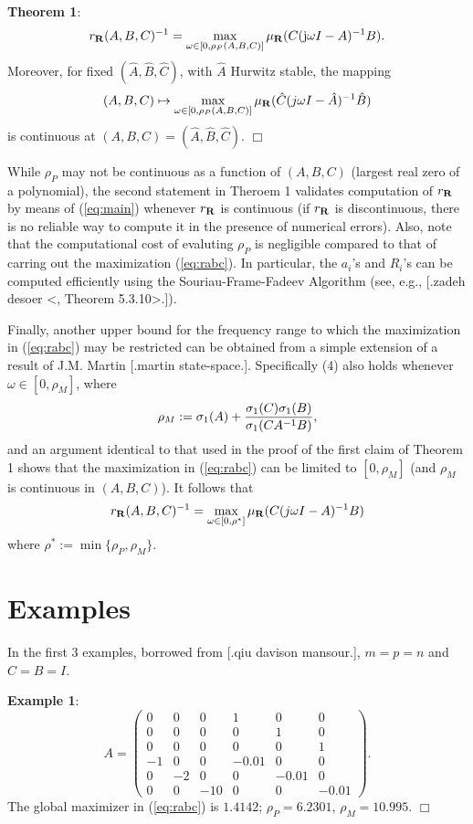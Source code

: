 \bigskip\noindent
{\bf Theorem 1}: 
\begin{equation}
r_{\bf R}(A,B,C)^{-1}=\max_{\omega \in [0, \rho_P(A,B,C)]}
\mu_{\bf R}(C({\rm j}\omega I-A)^{-1}B).
\label{eq:main}
\end{equation}
Moreover, for fixed $(\hat{A}, \hat{B}, \hat{C})$, with $\hat A$
Hurwitz stable, the mapping
\[
(A,B,C) \mapsto \max_{\omega \in [0,\rho_P(A,B,C)]}
\mu_{\bf R}(\hat{C}(j \omega I-\hat{A})^{-1}\hat{B})
\]
is continuous at $(A,B,C)=(\hat{A}, \hat{B}, \hat{C})$.
\hfill $\Box$

\noindent
While $\rho_P$ may not be continuous as a function of $(A,B,C)$ (largest 
real zero of a polynomial), the second statement in Theroem 1 
validates computation of $r_{\bf R}$ by means of (\ref{eq:main}) 
whenever $r_{\bf R}$ is continuous (if $r_{\bf R}$ is discontinuous, there 
is no reliable way to compute it in the presence of numerical errors).
Also, note that the computational cost of evaluting $\rho_P$ is 
negligible compared to that of carring out the maximization (\ref{eq:rabc}).
In particular, the $a_i$'s and $R_i$'s can be computed efficiently using
the Souriau-Frame-Fadeev Algorithm (see, e.g.,  [.zadeh desoer 
<, Theorem 5.3.10>.]).

Finally, another upper bound for the frequency range to which the maximization
in (\ref{eq:rabc}) may be restricted can be obtained from a simple extension
of a result of J.M. Martin [.martin state-space.]. Specifically (4) also holds 
whenever
$\omega \in [0,\rho_M]$, where 
\[
\rho_M:=\sigma_1(A)+{\sigma_1(C) \sigma_1(B) \over \sigma_1(CA^{-1}B)},
\]
and an argument identical to that used in the proof of the first claim of
Theorem 1 shows that the maximization in (\ref{eq:rabc}) can be limited to 
$[0, \rho_M]$ (and $\rho_M$ is continuous in $(A,B,C)$). It follows that
\[
r_{\bf R}(A,B,C)^{-1}=\max_{\omega \in [0,\rho^*]} \mu_{\bf R}(C(j\omega I-A)^{-1}B)
\]
where $\rho^*:=\min \{\rho_P, \rho_M\}$.

\bigskip
\section{Examples}

In the first $3$ examples, borrowed from [.qiu davison mansour.],
$m=p=n$ and $C=B=I$.

\smallskip
\noindent
{\bf Example 1}:
\[ A=
\left( \begin{array}{cccccc}
0 & 0 & 0 & 1 & 0 & 0 \\
0 & 0 & 0 & 0 & 1 & 0 \\
0 & 0 & 0 & 0 & 0 & 1 \\
-1 & 0 & 0 & -0.01 & 0 & 0 \\
0 & -2 & 0 & 0 & -0.01 & 0 \\
0 & 0 & -10 & 0 & 0 & -0.01
\end{array}
\right).   
\]
The global maximizer in (\ref{eq:rabc}) is 
$1.4142$; 
$\rho_P=6.2301$,
$\rho_M=10.995$.
\hfill $\Box$


